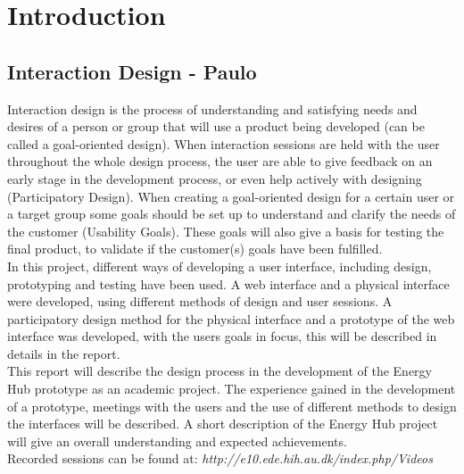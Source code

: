 \chapter{Introduction}
\section{Interaction Design - Paulo}
Interaction design is the process of understanding and satisfying needs and desires of a person or group that will use a product being developed (can be called a goal-oriented design). When interaction sessions are held with the user throughout the whole design process, the user are able to give feedback on an early stage in the development process, or even help actively with designing (Participatory Design).
When creating a goal-oriented design for a certain user or a target group some goals should be set up to understand and clarify the needs of the customer (Usability Goals). These goals will also give a basis for testing the final product, to validate if the customer(s) goals have been fulfilled.
\\[0.2cm]
In this project, different ways of developing a user interface, including design, prototyping and testing have been used.
A web interface and a physical interface were developed, using different methods of design and user sessions. A participatory design method for the physical interface and a prototype of the web interface was developed, with the users goals in focus, this will be described in details in the report.
\\[0.2cm]
This report will describe the design process in the development of the Energy Hub prototype as an academic project. The experience gained in the development of a prototype, meetings with the users and the use of different methods to design the interfaces will be described. A short description of the Energy Hub project will give an overall understanding and expected achievements.
\\[0.5cm]
Recorded sessions can be found at: \textit{http://e10.ede.hih.au.dk/index.php/Videos}
